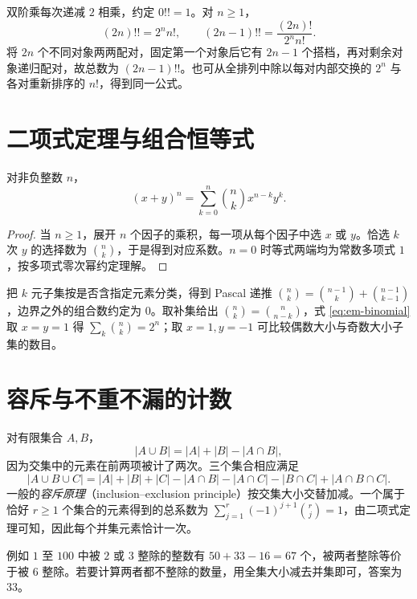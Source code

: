双阶乘每次递减 $2$ 相乘，约定 $0!!=1$。对 $n\ge1$，
\[
 (2n)!!=2^n n!,\qquad
 (2n-1)!!=\frac{(2n)!}{2^n n!}.
\]
将 $2n$ 个不同对象两两配对，固定第一个对象后它有 $2n-1$ 个搭档，再对剩余对象递归配对，故总数为 $(2n-1)!!$。也可从全排列中除以每对内部交换的 $2^n$ 与各对重新排序的 $n!$，得到同一公式。

\section{二项式定理与组合恒等式}
\begin{theorem}[二项式定理]
对非负整数 $n$，
\begin{equation}\label{eq:em-binomial}
 (x+y)^n=\sum_{k=0}^n\binom nk x^{n-k}y^k.
\end{equation}
\end{theorem}
\begin{proof}
当 $n\ge1$，展开 $n$ 个因子的乘积，每一项从每个因子中选 $x$ 或 $y$。恰选 $k$ 次 $y$ 的选择数为 $\binom nk$，于是得到对应系数。$n=0$ 时等式两端均为常数多项式 $1$，按多项式零次幂约定理解。
\end{proof}
把 $k$ 元子集按是否含指定元素分类，得到 Pascal 递推 $\binom nk=\binom{n-1}k+\binom{n-1}{k-1}$，边界之外的组合数约定为 $0$。取补集给出 $\binom nk=\binom n{n-k}$，式 \eqref{eq:em-binomial} 取 $x=y=1$ 得 $\sum_k\binom nk=2^n$；取 $x=1,y=-1$ 可比较偶数大小与奇数大小子集的数目。

\section{容斥与不重不漏的计数}
对有限集合 $A,B$，
\[
 |A\cup B|=|A|+|B|-|A\cap B|,
\]
因为交集中的元素在前两项被计了两次。三个集合相应满足
\[
 |A\cup B\cup C|=|A|+|B|+|C|
 -|A\cap B|-|A\cap C|-|B\cap C|+|A\cap B\cap C|.
\]
一般的\emph{容斥原理}（inclusion--exclusion principle）按交集大小交替加减。一个属于恰好 $r\ge1$ 个集合的元素得到的总系数为 $\sum_{j=1}^r(-1)^{j+1}\binom rj=1$，由二项式定理可知，因此每个并集元素恰计一次。

例如 $1$ 至 $100$ 中被 $2$ 或 $3$ 整除的整数有 $50+33-16=67$ 个，被两者整除等价于被 $6$ 整除。若要计算两者都不整除的数量，用全集大小减去并集即可，答案为 $33$。

